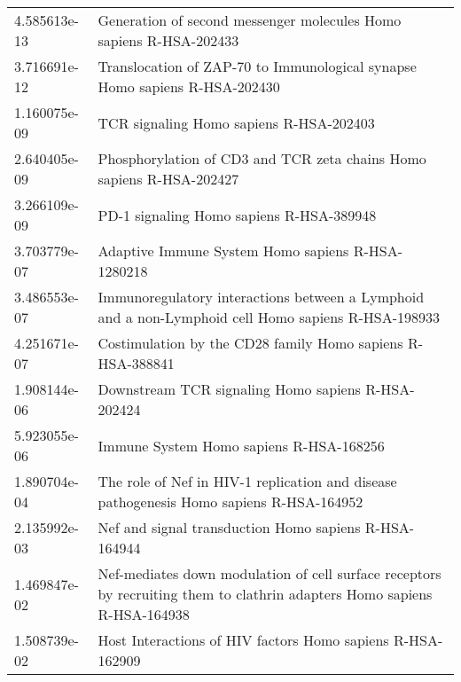 \begin{longtable}{p{2.4cm}p{14.5cm}}
\bottomrule
\endlastfoot
             4.585613e-13 &                                                        Generation of second messenger molecules Homo sapiens R-HSA-202433 \\
             3.716691e-12 &                                                Translocation of ZAP-70 to Immunological synapse Homo sapiens R-HSA-202430 \\
             1.160075e-09 &                                                                                   TCR signaling Homo sapiens R-HSA-202403 \\
             2.640405e-09 &                                                      Phosphorylation of CD3 and TCR zeta chains Homo sapiens R-HSA-202427 \\
             3.266109e-09 &                                                                                  PD-1 signaling Homo sapiens R-HSA-389948 \\
             3.703779e-07 &                                                                         Adaptive Immune System Homo sapiens R-HSA-1280218 \\
             3.486553e-07 &                        Immunoregulatory interactions between a Lymphoid and a non-Lymphoid cell Homo sapiens R-HSA-198933 \\
             4.251671e-07 &                                                                Costimulation by the CD28 family Homo sapiens R-HSA-388841 \\
             1.908144e-06 &                                                                        Downstream TCR signaling Homo sapiens R-HSA-202424 \\
             5.923055e-06 &                                                                                   Immune System Homo sapiens R-HSA-168256 \\
             1.890704e-04 &                                   The role of Nef in HIV-1 replication and disease pathogenesis Homo sapiens R-HSA-164952 \\
             2.135992e-03 &                                                                     Nef and signal transduction Homo sapiens R-HSA-164944 \\
             1.469847e-02 &  Nef-mediates down modulation of cell surface receptors by recruiting them to clathrin adapters Homo sapiens R-HSA-164938 \\
             1.508739e-02 &                                                                Host Interactions of HIV factors Homo sapiens R-HSA-162909 \\
\end{longtable}


